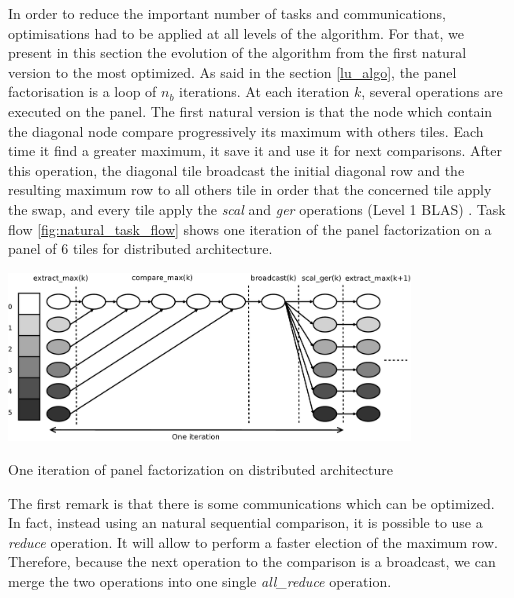 In order to reduce the important number of tasks and communications, optimisations had to be applied at all levels of the algorithm. For that, we present in this section the evolution of the algorithm from the first natural version to the most optimized. As said in the section \ref{lu_algo}, the panel factorisation is a loop of $n_b$ iterations. At each iteration $k$, several operations are executed on the panel.
The first natural version is that the node which contain the diagonal node compare progressively its maximum with others tiles. Each time it find a greater maximum, it save it and use it for next comparisons. After this operation, the diagonal tile broadcast the initial diagonal row and the resulting maximum row to all others tile in order that the concerned tile apply the swap, and every tile apply the \emph{scal} and \emph{ger} operations (Level 1 BLAS) \cite{reference/parallel/X11ab}. Task flow \ref{fig:natural_task_flow} shows one iteration of the panel factorization on a panel of 6 tiles for distributed architecture.

\begin{taskflow}[!ht]
\centering
\includegraphics[width=0.8\textwidth]{figures/natural_tf_bw.pdf}
\caption{One iteration of panel factorization on distributed architecture \label{fig:natural_task_flow}}
\end{taskflow}

The first remark is that there is some communications which can be optimized. In fact, instead using an natural sequential comparison, it is possible to use a \emph{reduce} operation. It will allow to perform a faster election of the maximum row. Therefore, because the next operation to the comparison is a broadcast, we can merge the two operations into one single \textit{all\_reduce} operation.

